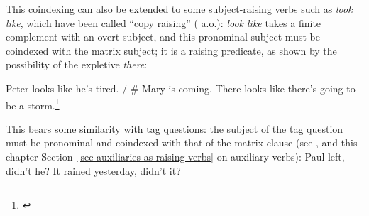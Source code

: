 This coindexing can also be extended to some subject-raising verbs such as \emph{look like}, which
have been called ``copy raising'' (\citealp{Rogers74a-u,Hornstein99a-u} a.o.): \emph{look like} takes a finite
complement with an overt subject, and this pronominal subject must be coindexed with the matrix
subject;
it is a raising predicate, as shown by the possibility of the expletive \emph{there}:


\eal
\ex Peter looks like he's tired. / \# Mary is coming.
\ex There looks like there's going to be a storm.\footnote{
\citet[]{Sag2007a}
}
\zl



This bears some similarity with  tag questions: the  subject of the tag question must be
pronominal and coindexed with that of the matrix clause (see \citealt{BF99a}, and this chapter Section~\ref{sec-auxiliaries-as-raising-verbs} on auxiliary verbs):
\eal \label{extag}
\ex Paul left, didn't he?\label{ex-paul-left-didnt-he}
\ex It rained yesterday, didn't it?
\zl


